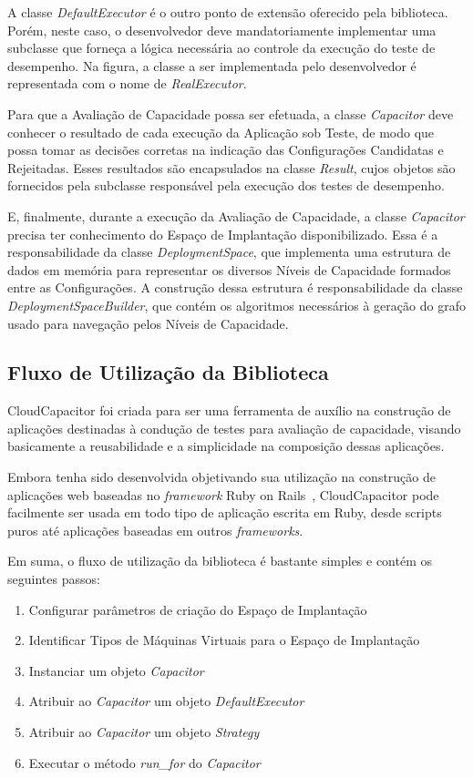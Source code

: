A classe \emph{DefaultExecutor} é o outro ponto de extensão oferecido pela biblioteca.
Porém, neste caso, o desenvolvedor deve mandatoriamente implementar uma subclasse
que forneça a lógica necessária ao controle da execução do teste de desempenho.
Na figura, a classe a ser implementada pelo desenvolvedor é representada com o 
nome de \emph{RealExecutor}.

Para que a Avaliação de Capacidade possa ser efetuada, a classe \emph{Capacitor}
deve conhecer o resultado de cada execução da Aplicação sob Teste, de modo que
possa tomar as decisões corretas na indicação das Configurações Candidatas e
Rejeitadas. Esses resultados são encapsulados na classe \emph{Result}, cujos 
objetos são fornecidos pela subclasse responsável pela execução dos testes de 
desempenho.

E, finalmente, durante a execução da Avaliação de Capacidade, a classe \emph{Capacitor} 
precisa ter conhecimento do Espaço de Implantação disponibilizado. Essa é a 
responsabilidade da classe \emph{DeploymentSpace}, que implementa uma estrutura 
de dados em memória para representar os diversos Níveis de Capacidade formados 
entre as Configurações. A construção dessa estrutura é responsabilidade da classe 
\emph{DeploymentSpaceBuilder}, que contém os algoritmos necessários à geração 
do grafo usado para navegação pelos Níveis de Capacidade. 

\subsection{Fluxo de Utilização da Biblioteca}
\label{subsec:fluxo}
CloudCapacitor foi criada para ser uma ferramenta de auxílio na construção de 
aplicações destinadas à condução de testes para avaliação de capacidade,
visando basicamente a reusabilidade e a simplicidade na composição dessas 
aplicações.

Embora tenha sido desenvolvida objetivando sua utilização na construção de 
aplicações web baseadas no \emph{framework} Ruby on Rails~\cite{rails}, CloudCapacitor pode facilmente
ser usada em todo tipo de aplicação escrita em Ruby, desde scripts puros até
aplicações baseadas em outros \emph{frameworks}.

Em suma, o fluxo de utilização da biblioteca é bastante simples e contém os seguintes passos:

\begin{enumerate}
  \item Configurar parâmetros de criação do Espaço de Implantação 
  \item Identificar Tipos de Máquinas Virtuais para o Espaço de Implantação
  \item Instanciar um objeto \emph{Capacitor}
  \item Atribuir ao \emph{Capacitor} um objeto \emph{DefaultExecutor}
  \item Atribuir ao \emph{Capacitor} um objeto \emph{Strategy}
  \item Executar o método \emph{run\_for} do \emph{Capacitor}
\end{enumerate}

